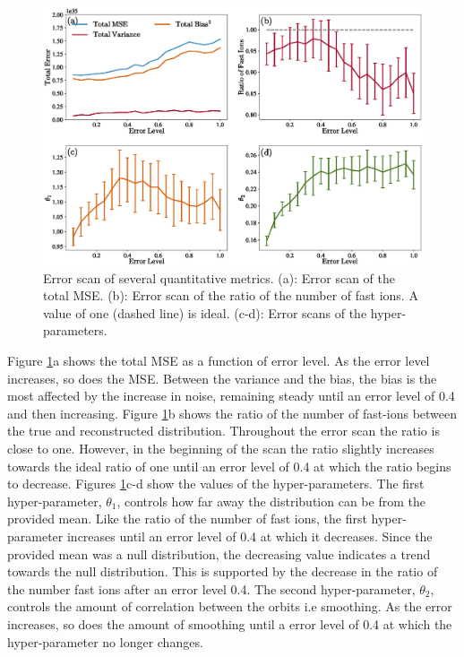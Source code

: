 \begin{figure}[h!]
    \centering
    \includegraphics[width=14cm]{figures/error_scan.eps}
    \caption{Error scan of several quantitative metrics. (a): Error scan of the total MSE. (b): Error scan of the ratio of the number of fast ions. A value of one (dashed line) is ideal. (c-d): Error scans of the hyper-parameters.}
    \label{fig:error_scan}
\end{figure}
Figure \ref{fig:error_scan}a shows the total MSE as a function of error level. As the error level increases, so does the MSE. Between the variance and the bias, the bias is the most affected by the increase in noise, remaining steady until an error level of 0.4 and then increasing. Figure \ref{fig:error_scan}b shows the ratio of the number of fast-ions between the true and reconstructed distribution. Throughout the error scan the ratio is close to one. However, in the beginning of the scan the ratio slightly increases towards the ideal ratio of one until an error level of 0.4 at which the ratio begins to decrease. Figures \ref{fig:error_scan}c-d show the values of the hyper-parameters. The first hyper-parameter, $\theta_1$, controls how far away the distribution can be from the provided mean.  Like the ratio of the number of fast ions, the first hyper-parameter increases until an error level of 0.4 at which it decreases. Since the provided mean was a null distribution, the decreasing value indicates a trend towards the null distribution. This is supported by the decrease in the ratio of the number fast ions after an error level 0.4. The second hyper-parameter, $\theta_2$, controls the amount of correlation between the orbits i.e smoothing. As the error increases, so does the amount of smoothing until a error level of 0.4 at which the hyper-parameter no longer changes.

